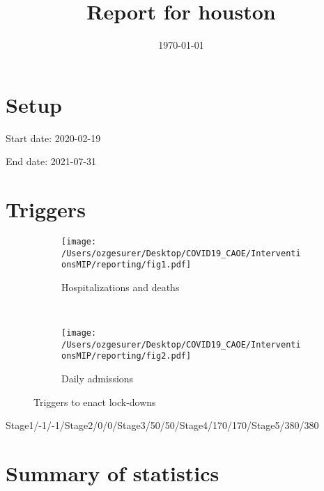 \documentclass{article}
\title{Report for houston}
\author{}
\date{\today}
\begin{document}
\maketitle

\section*{Setup}

Start date: 2020-02-19

End date: 2021-07-31 




\section*{Triggers}
\begin{figure}[!htb]
  \centering
  \setlength{\unitlength}{1cm}
    \begin{subfigure}[b]{0.475\linewidth}
    \centering
        \texttt{[image: /Users/ozgesurer/Desktop/COVID19\_CAOE/InterventionsMIP/reporting/fig1.pdf]}
        \caption{Hospitalizations  and deaths}
        \label{fig:IHD}
    \end{subfigure}
    ~
    \begin{subfigure}[b]{0.475\linewidth}
    \centering
         \texttt{[image: /Users/ozgesurer/Desktop/COVID19\_CAOE/InterventionsMIP/reporting/fig2.pdf]}
        \caption{Daily admissions}
        \label{fig:IYIH}
    \end{subfigure}
    \caption{Triggers to enact lock-downs}\label{fig:SD90}
\end{figure}

Stage1/-1/-1/Stage2/0/0/Stage3/50/50/Stage4/170/170/Stage5/380/380

\newpage

\section*{Summary of statistics}
\end{document}
